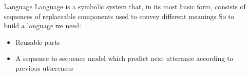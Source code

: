 \begin{frame}[allowframebreaks]{Language}
    Language is a symbolic system that, in its most basic form, consists of sequences of replaceable components used to convey different meanings \cite{saussure-1916-course-in-general-linguistics}
    So to build a language we need:
    \begin{itemize}
        \item Reusable parts
        \item A sequence to sequence model which predict next utterance according to previous utterences
    \end{itemize}
\end{frame}